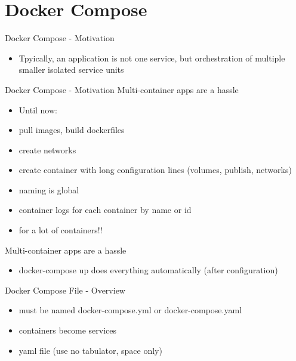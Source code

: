 \documentclass[10pt,aspectratio=\ratio,
compress
]{beamer}
\begin{document}
\section{Docker Compose}
\begin{frame}{Docker Compose - Motivation}
\begin{itemize}
	\item Tpyically, an application is not one service, but orchestration of multiple smaller isolated service units
\end{itemize}
\end{frame}
\begin{frame}{Docker Compose - Motivation}
Multi-container apps are a hassle
\begin{itemize}
	\item Until now:
	\item pull images, build dockerfiles
	\item create networks
	\item create container with long configuration lines (volumes, publish, networks)
	\item naming is global
	\item container logs for each container by name or id
	\item for a lot of containers!!
\end{itemize}
Multi-container apps are a hassle
\begin{itemize}
	\item docker-compose up does everything automatically (after configuration)
\end{itemize}
\end{frame}

\begin{frame}{Docker Compose File - Overview}

\begin{itemize}
	\item must be named docker-compose.yml or docker-compose.yaml
	\item containers become services
	\item yaml file (use no tabulator, space only)
\end{itemize}
\end{frame}
\end{document}
